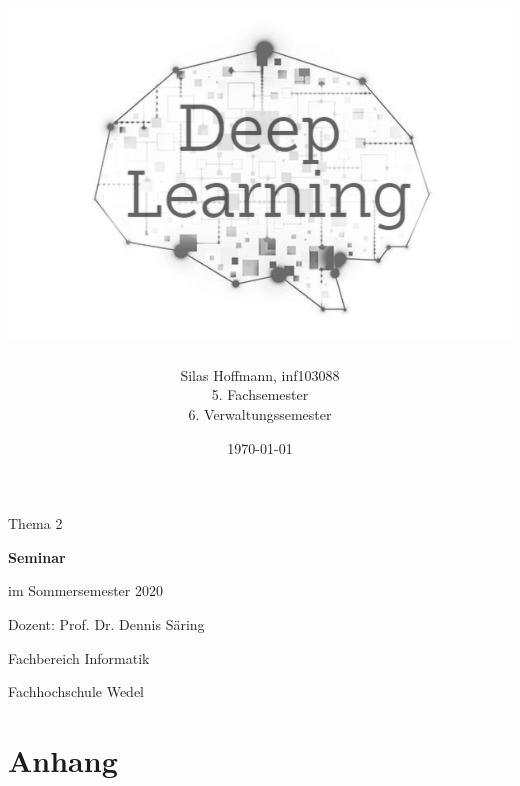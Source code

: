 \documentclass[a4paper, 11pt]{scrartcl}
\title{\includegraphics[width=\linewidth]{img/dl_logo}}
\author{Silas Hoffmann, inf103088
\normalsize
\\5. Fachsemester
\\6. Verwaltungssemester}
\date{\today}
\begin{document}
\maketitle

\vfill
\begin{center}
	Thema 2
	
	\vspace{0.5cm}
	\Large
	\textbf{Seminar}
	\normalsize
	
	\vspace{0.3cm}
	im Sommersemester 2020
	
	\vspace{0.5cm}
	Dozent: Prof. Dr. Dennis Säring
	
	\vfill
	\small
	Fachbereich Informatik
	
	\vspace{0.3cm}
	Fachhochschule Wedel
\end{center}
\thispagestyle{empty}
\restoregeometry

\newpage
\pagestyle{plain}
\tableofcontents
\newpage
% 
\listoffigures
\newpage

\pagestyle{fancy}




\clearpage


 
\clearpage
\appendix
{}
\thispagestyle{plain}

\nocite{*} 




\clearpage
\section{Anhang}

\end{document}
